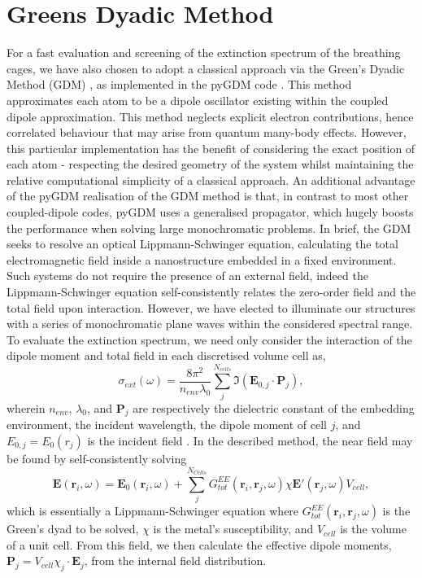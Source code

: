 \section{Greens Dyadic Method}
\label{sec:GDM}
For a fast evaluation and screening of the extinction spectrum of the breathing cages, we have also chosen to adopt a classical approach via the Green's Dyadic Method (GDM) \cite{GDM,Girard_2005},  as implemented in the pyGDM code \cite{pyGDM,pyGDMarXiv}. This method approximates each atom to be a dipole oscillator existing within the coupled dipole approximation. This method neglects explicit electron contributions, hence correlated behaviour that may arise from quantum many-body effects. However, this particular implementation has the benefit of considering the exact position of each atom - respecting the desired geometry of the system whilst maintaining the relative computational simplicity of a classical approach. An additional advantage of the pyGDM realisation of the GDM method is that, in contrast to most other coupled-dipole codes, pyGDM uses a generalised propagator, which hugely boosts the performance when solving large monochromatic problems.
In brief, the GDM seeks to resolve an optical Lippmann-Schwinger equation, calculating the total electromagnetic field inside a nanostructure embedded in a fixed environment. Such systems do not require the presence of an external field, indeed the Lippmann-Schwinger equation self-consistently relates the zero-order field and the total field upon interaction. However, we have elected to illuminate our structures with a series of monochromatic plane waves within the considered spectral range.
%
To evaluate the extinction spectrum, we need only consider the interaction of the dipole moment and total field in each discretised volume cell as,
\begin{equation}
    \sigma_{ext}\left( \omega \right) = \frac{8\pi^{2}}{n_{env}\lambda_{0}} \sum_{j}^{N_{cells}} \Im \left( \textbf{E}_{0,j} \cdot \textbf{P}_{j} \right),
    \label{eqn:ext_gdm}
\end{equation}
wherein $n_{env}$, $\lambda_{0}$, and $\textbf{P}_{j}$ are respectively the dielectric constant of the embedding environment, the incident wavelength, the dipole moment of cell $j$, and $E_{0,j}=E_0(r_j)$ is the incident field \cite{Dipole_Spec_Class}. In the described method, the near field may be found by self-consistently solving
\begin{equation}
    \textbf{E} \left( \textbf{r}_{i}, \omega \right) = \textbf{E}_{0} \left( \textbf{r}_{i}, \omega \right) + \sum_{j}^{N_{Cells}} G_{tot}^{EE} \left( \textbf{r}_{i},\textbf{r}_{j}, \omega \right) \chi \textbf{E}'\left( \textbf{r}_{j}, \omega \right) V_{cell},
    \label{eqn:GDM}
\end{equation}
which is essentially a Lippmann-Schwinger equation where $G_{tot}^{EE} \left( \textbf{r}_{i},\textbf{r}_{j}, \omega \right)$ is the Green's dyad to be solved, $\chi$ is the metal's susceptibility, and $V_{cell}$ is the volume of a unit cell. From this field, we then calculate the effective dipole moments, $\mathbf{P}_j= V_{cell} \chi_j \cdot \mathbf{E}_j$, from the internal field distribution.

